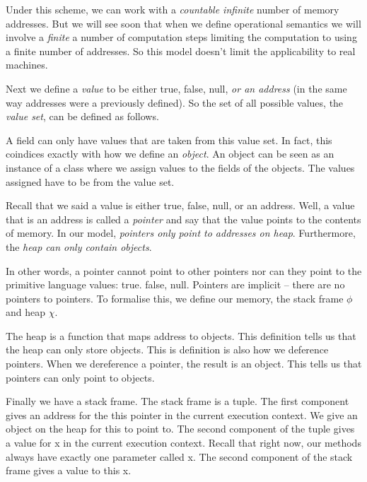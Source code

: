 
Under this scheme, we can work with a \textit{countable infinite} 
number of memory addresses. 
But we will see soon that when we define operational semantics
we will involve a \textit{finite} a number of computation 
steps limiting the computation to using a finite number of addresses. 
So this model doesn't limit the applicability to real machines.

Next we define a \textit{value} to be either true, false, null, \textit{or 
an address} (in the same way addresses were a previously defined). 
So the set of all possible values, 
the \textit{value set}, can be defined as follows.


A field can only have values that are taken from this value set. 
In fact, this coindices exactly with how we define an \textit{object}. 
An object can be seen as an instance 
of a class where we assign values to the fields of the objects. 
The values assigned have to be from the value set.


Recall that we said a value is either true, false, null, or 
an address. Well, a value that is an address is called a
 \textit{pointer} and say that the value points to the contents of memory.
In our model, \textit{pointers only point to addresses on heap}. 
Furthermore, the \textit{heap can only contain objects}.

In other words, a pointer cannot point to other pointers nor can they point to the primitive language values: true. false, null. Pointers are implicit – there are 
no pointers to pointers. To formalise this, we define our memory, the stack 
frame $\phi$ and heap $\chi$.


The heap is a function that maps address to objects. 
This definition tells us that the heap can only store objects. 
This is definition is also how we deference pointers. When we 
dereference a pointer, the result is an object. This tells us that 
pointers can only point to objects.

Finally we have a stack frame.
The stack frame is a tuple. The first component gives an address for the this
pointer in the current execution context. We give an object on the heap for this 
to point to. The second component of the tuple gives a value for x in the 
current execution context. Recall that right now, our methods always have exactly
one parameter called x. The second component of the stack frame gives a value to this x. 

